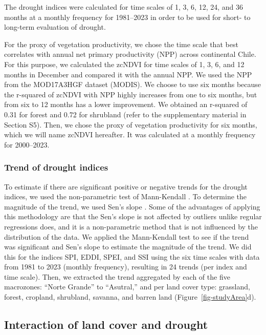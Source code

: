 \documentclass[
  authoryear,
  preprint,
  3p,
  onecolumn]{elsarticle}
\begin{document}
The drought indices were calculated for time scales of 1, 3, 6, 12, 24,
and 36 months at a monthly frequency for 1981--2023 in order to be used
for short- to long-term evaluation of drought.

For the proxy of vegetation productivity, we chose the time scale that
best correlates with annual net primary productivity (NPP) across
continental Chile. For this purpose, we calculated the zcNDVI for time
scales of 1, 3, 6, and 12 months in December and compared it with the
annual NPP. We used the NPP from the MOD17A3HGF \citep{Running2019}
dataset (MODIS). We choose to use six months because the r-squared of
zcNDVI with NPP highly increases from one to six months, but from six to
12 months has a lower improvement. We obtained an r-squared of 0.31 for
forest and 0.72 for shrubland (refer to the supplementary material in
Section S5). Then, we chose the proxy of vegetation productivity for six
months, which we will name zcNDVI hereafter. It was calculated at a
monthly frequency for 2000--2023.

\hypertarget{trend-of-drought-indices}{%
\subsubsection{Trend of drought
indices}\label{trend-of-drought-indices}}

To estimate if there are significant positive or negative trends for the
drought indices, we used the non-parametric test of Mann-Kendall
\citep{Kendall1975}. To determine the magnitude of the trend, we used
Sen's slope \citep{Sen1968}. Some of the advantages of applying this
methodology are that the Sen's slope is not affected by outliers unlike
regular regressions does, and it is a non-parametric method that is not
influenced by the distribution of the data. We applied the Mann-Kendall
test to see if the trend was significant and Sen's slope to estimate the
magnitude of the trend. We did this for the indices SPI, EDDI, SPEI, and
SSI using the six time scales with data from 1981 to 2023 (monthly
frequency), resulting in 24 trends (per index and time scale). Then, we
extracted the trend aggregated by each of the five macrozones: ``Norte
Grande'' to ``Asutral,'' and per land cover type: grassland, forest,
cropland, shrubland, savanna, and barren land
(Figure~\ref{fig-studyArea}d).

\hypertarget{interaction-of-land-cover-and-drought}{%
\subsection{Interaction of land cover and
drought}\label{interaction-of-land-cover-and-drought}}
\end{document}
